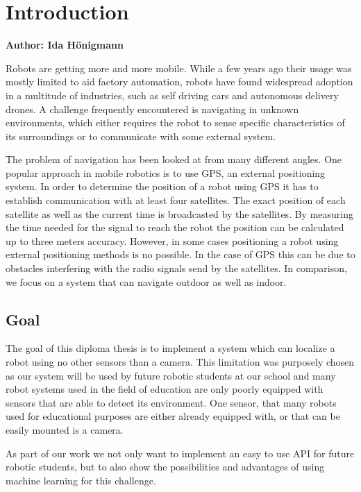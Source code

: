 \chapter{Introduction}

\textbf{Author: Ida Hönigmann}

\vspace{2mm}

Robots are getting more and more mobile. While a few years ago their usage was mostly limited to aid factory automation, robots have found widespread adoption in a multitude of industries, such as self driving cars and autonomous delivery drones.
A challenge frequently encountered is navigating in unknown environments, which either requires the robot to sense specific characteristics of its surroundings or to communicate with some external system.

The problem of navigation has been looked at from many different angles. One popular approach in mobile robotics is to use GPS, an external positioning system. In order to determine the position of a robot using GPS it has to establish communication with at least four satellites. The exact position of each satellite as well as the current time is broadcasted by the satellites. By measuring the time needed for the signal to reach the robot the position can be calculated up to three meters accuracy.
However, in some cases positioning a robot using external positioning methods is no possible. In the case of GPS this can be due to obstacles interfering with the radio signals send by the satellites.
In comparison, we focus on a system that can navigate outdoor as well as indoor. 

\section{Goal}
The goal of this diploma thesis is to implement a system which can localize a robot using no other sensors than a camera. This limitation was purposely chosen as our system will be used by future robotic students at our school and many robot systems used in the field of education are only poorly equipped with sensors that are able to detect its environment. One sensor, that many robots used for educational purposes are either already equipped with, or that can be easily mounted is a camera.

As part of our work we not only want to implement an easy to use API for future robotic students, but to also show the possibilities and advantages of using machine learning for this challenge.

